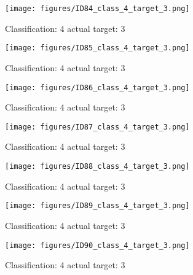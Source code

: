 \begin{figure}[h!]
\begin{center}
\texttt{[image: figures/ID84\_class\_4\_target\_3.png]}
\end{center}
\caption{ Classification: 4 actual target: 3}
\label{fig:ID84_class_4_target_3}
\end{figure}
\begin{figure}[h!]
\begin{center}
\texttt{[image: figures/ID85\_class\_4\_target\_3.png]}
\end{center}
\caption{ Classification: 4 actual target: 3}
\label{fig:ID85_class_4_target_3}
\end{figure}
\begin{figure}[h!]
\begin{center}
\texttt{[image: figures/ID86\_class\_4\_target\_3.png]}
\end{center}
\caption{ Classification: 4 actual target: 3}
\label{fig:ID86_class_4_target_3}
\end{figure}
\begin{figure}[h!]
\begin{center}
\texttt{[image: figures/ID87\_class\_4\_target\_3.png]}
\end{center}
\caption{ Classification: 4 actual target: 3}
\label{fig:ID87_class_4_target_3}
\end{figure}
\begin{figure}[h!]
\begin{center}
\texttt{[image: figures/ID88\_class\_4\_target\_3.png]}
\end{center}
\caption{ Classification: 4 actual target: 3}
\label{fig:ID88_class_4_target_3}
\end{figure}
\begin{figure}[h!]
\begin{center}
\texttt{[image: figures/ID89\_class\_4\_target\_3.png]}
\end{center}
\caption{ Classification: 4 actual target: 3}
\label{fig:ID89_class_4_target_3}
\end{figure}
\begin{figure}[h!]
\begin{center}
\texttt{[image: figures/ID90\_class\_4\_target\_3.png]}
\end{center}
\caption{ Classification: 4 actual target: 3}
\label{fig:ID90_class_4_target_3}
\end{figure}

